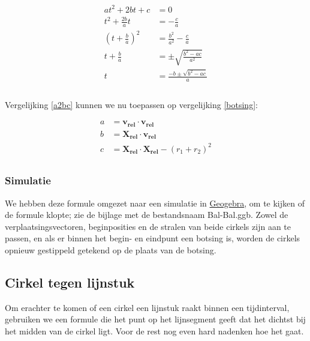 \documentclass[12pt,a4paper]{article}
\begin{document}
	\begin{equation}
		\label{a2bc}
		\begin{aligned}
			at^2+2bt+c &= 0 \\
			t^2+\tfrac{2b}{a}t &= -\frac{c}{a} \\
			\left( t+\tfrac{b}{a} \right)^2 &= \frac{b^2}{a^2} -\frac{c}{a} \\
			t + \tfrac{b}{a} &= \pm \sqrt{\frac{b^2 - ac}{a^2}} \\
			t &= \frac{-b \pm \sqrt{b^2 - ac}}{a}\\
		\end{aligned}
	\end{equation}
	\\Vergelijking \eqref{a2bc} kunnen we nu toepassen op vergelijking \eqref{botsing}:
	
	\begin{equation}
		\begin{aligned}
			a &= \mathbf{v_{rel}} \cdot \mathbf{v_{rel}} \\
			b &= \mathbf{X_{rel}} \cdot \mathbf{v_{rel}} \\
			c &= \mathbf{X_{rel}} \cdot \mathbf{X_{rel}} - (r_1 + r_2)^2\\
		\end{aligned}
	\end{equation}
	
	\subsubsection{Simulatie}
	We hebben deze formule omgezet naar een simulatie in \href{http://www.geogebra.org/webstart/geogebra.html}{Geogebra}, om te kijken of de formule klopte; zie de bijlage met de bestandsnaam Bal-Bal.ggb. Zowel de verplaatsingsvectoren, beginposities en de stralen van beide cirkels zijn aan te passen, en als er binnen het begin- en eindpunt een botsing is, worden de cirkels opnieuw gestippeld getekend op de plaats van de botsing.
	
	\subsection{Cirkel tegen lijnstuk}
	Om erachter te komen of een cirkel een lijnstuk raakt binnen een tijdinterval, gebruiken we een formule die het punt op het lijnsegment geeft dat het dichtst bij het midden van de cirkel ligt. Voor de rest nog even hard nadenken hoe het gaat.
	
\end{document}
